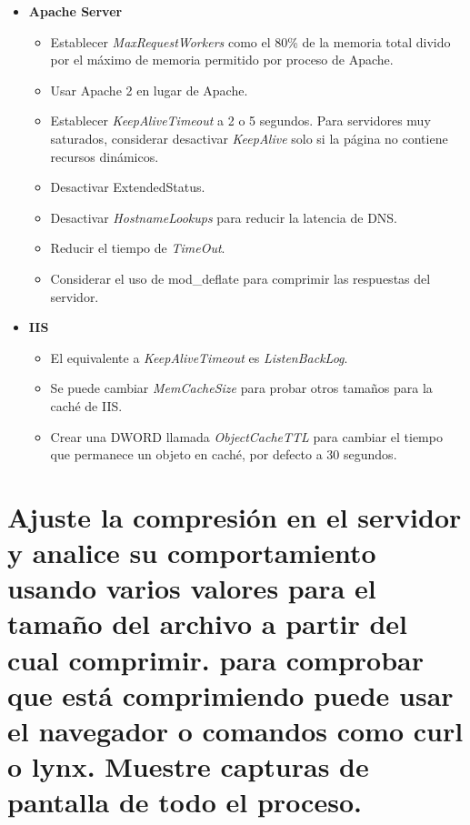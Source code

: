 \begin{itemize}
	\item \textbf{Apache Server}
			\begin{itemize}
				\item Establecer \textit{MaxRequestWorkers} como el 80\% de la memoria total divido por el máximo de memoria permitido por proceso de Apache. 
				\item Usar Apache 2 en lugar de Apache.
				\item Establecer \textit{KeepAliveTimeout} a 2 o 5 segundos. Para servidores muy saturados, considerar desactivar \textit{KeepAlive} solo si la página no contiene recursos dinámicos.
				\item Desactivar ExtendedStatus.
				\item Desactivar \textit{HostnameLookups} para reducir la latencia de DNS.
				\item Reducir el tiempo de \textit{TimeOut}.
				\item Considerar el uso de mod\_deflate para comprimir las respuestas del servidor.
			\end{itemize}
	\item \textbf{IIS}
			\begin{itemize}
				\item El equivalente a \textit{KeepAliveTimeout} es \textit{ListenBackLog}.
				\item Se puede cambiar \textit{MemCacheSize} para probar otros tamaños para la caché de IIS.
				\item Crear una DWORD llamada \textit{ObjectCacheTTL} para cambiar el tiempo que permanece un objeto en caché, por defecto a 30 segundos.
			\end{itemize}
\end{itemize}





\vspace{5mm}


\section{Ajuste la compresión en el servidor y analice su comportamiento usando varios valores para el tamaño del archivo a partir del cual comprimir. para comprobar que está comprimiendo puede usar el navegador o comandos como curl o lynx. Muestre capturas de pantalla de todo el proceso.}

